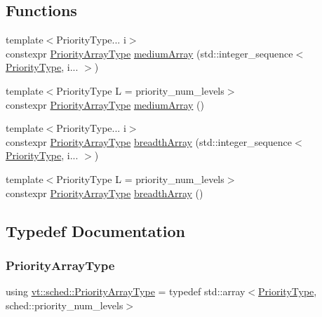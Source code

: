 \subsection*{Functions}
\begin{DoxyCompactItemize}
\item 
{\footnotesize template$<$Priority\+Type... i$>$ }\\constexpr \hyperlink{namespacevt_1_1sched_a2dbd1daff26f79efbff3f418ad9b2a8b}{Priority\+Array\+Type} \hyperlink{namespacevt_1_1sched_a05afd033ab9ecc1f0d1dc37b8b9b7827}{medium\+Array} (std\+::integer\+\_\+sequence$<$ \hyperlink{namespacevt_a86bff9f556eb761b27fc8600d006ac04}{Priority\+Type}, i... $>$)
\item 
{\footnotesize template$<$Priority\+Type L = priority\+\_\+num\+\_\+levels$>$ }\\constexpr \hyperlink{namespacevt_1_1sched_a2dbd1daff26f79efbff3f418ad9b2a8b}{Priority\+Array\+Type} \hyperlink{namespacevt_1_1sched_a3f4c11ddd24523a16b3f3606a4662014}{medium\+Array} ()
\item 
{\footnotesize template$<$Priority\+Type... i$>$ }\\constexpr \hyperlink{namespacevt_1_1sched_a2dbd1daff26f79efbff3f418ad9b2a8b}{Priority\+Array\+Type} \hyperlink{namespacevt_1_1sched_a4a522d8f67561a0ae0446769584c2deb}{breadth\+Array} (std\+::integer\+\_\+sequence$<$ \hyperlink{namespacevt_a86bff9f556eb761b27fc8600d006ac04}{Priority\+Type}, i... $>$)
\item 
{\footnotesize template$<$Priority\+Type L = priority\+\_\+num\+\_\+levels$>$ }\\constexpr \hyperlink{namespacevt_1_1sched_a2dbd1daff26f79efbff3f418ad9b2a8b}{Priority\+Array\+Type} \hyperlink{namespacevt_1_1sched_ac82001576ed1c9cee962ed07113cebe7}{breadth\+Array} ()
\end{DoxyCompactItemize}


\subsection{Typedef Documentation}
\mbox{\label{namespacevt_1_1sched_a2dbd1daff26f79efbff3f418ad9b2a8b}} 
\subsubsection{\texorpdfstring{Priority\+Array\+Type}{PriorityArrayType}}
{\footnotesize\ttfamily using \hyperlink{namespacevt_1_1sched_a2dbd1daff26f79efbff3f418ad9b2a8b}{vt\+::sched\+::\+Priority\+Array\+Type} = typedef std\+::array$<$\hyperlink{namespacevt_a86bff9f556eb761b27fc8600d006ac04}{Priority\+Type}, sched\+::priority\+\_\+num\+\_\+levels$>$}

